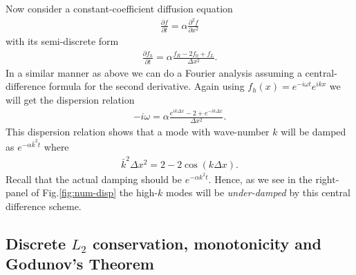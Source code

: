 \documentclass[12pt]{article}
\theoremstyle{definition}
\theoremstyle{definition}
\theoremstyle{definition}
\newcommand{\pfrac}[2]{\frac{\partial #1}{\partial #2}}
\newcommand{\pfracc}[2]{\frac{\partial^2 #1}{\partial #2^2}}
\begin{document}
Now consider a constant-coefficient diffusion equation
\begin{align}
  \pfrac{f}{t} = \alpha \pfracc{f}{x}
\end{align}
with its semi-discrete form
\begin{align}
  \pfrac{f_h}{t} = \alpha \frac{f_R - 2 f_0 + f_L}{\Delta x^2}.
\end{align}
In a similar manner as above we can do a Fourier analysis assuming a
central-difference formula for the second derivative. Again using
$f_h(x) = e^{-i\omega t} e^{ikx}$ we will get the dispersion relation
\begin{align}
  -i\omega
  =
  \alpha \frac{e^{ik \Delta x } - 2 + e^{-ik \Delta x } }{\Delta x^2}.
\end{align}
This dispersion relation shows that a mode with wave-number $k$ will
be damped as $e^{-\alpha \bar{k}^2 t}$ where
\begin{align}
  \bar{k}^2\Delta x^2 = 2 - 2 \cos(k \Delta x).
\end{align}
Recall that the actual damping should be $e^{-\alpha k^2 t}$. Hence,
as we see in the right-panel of Fig.\thinspace\ref{fig:num-disp} the
high-$k$ modes will be \emph{under-damped} by this central difference
scheme.

\subsection{Discrete $L_2$ conservation, monotonicity and Godunov's
  Theorem}
\end{document}
